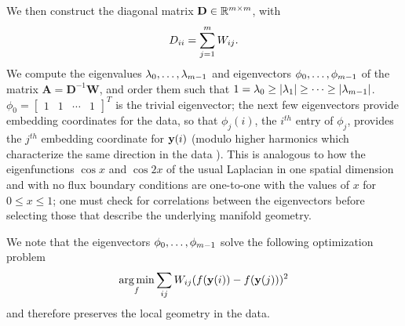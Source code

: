 We then construct the diagonal matrix $\mathbf{D} \in \mathbb{R}^{m \times m}$, with
\begin{equation}
D_{ii} = \sum_{j=1}^m W_{ij}.
\end{equation}
%
We compute the eigenvalues $\lambda_0, \dots, \lambda_{m-1}$ and eigenvectors $\phi_0, \dots, \phi_{m-1}$ of the matrix $\mathbf{A} = \mathbf{D}^{-1}\mathbf{W}$, and order them such that $1 = \lambda_0 \ge |\lambda_1| \ge \dots \ge |\lambda_{m-1}|$.
%
$\phi_0 = \begin{bmatrix} 1 & 1 & \cdots & 1 \end{bmatrix}^T$
is the trivial eigenvector; the next few eigenvectors provide embedding coordinates for the data, so that $\phi_j(i)$, the $i^{th}$ entry of $\phi_j$, provides the $j^{th}$ embedding coordinate for $\mathbf{y}(i)$ (modulo higher harmonics which characterize
the same direction in the data \cite{ferguson2010systematic}).
%
This is analogous to how the eigenfunctions $\cos x$ and $\cos 2x$ of the usual Laplacian in one spatial dimension
and with no flux boundary conditions are one-to-one with the values of $x$ for $0 \le x \le 1$;
one must check for correlations between the eigenvectors before selecting those that describe the underlying manifold geometry.


We note that the eigenvectors $\phi_0, \dots, \phi_{m-1}$ solve the following optimization problem \citep{Belkin2003}
\begin{equation} \label{eq:dmaps_opt_problem}
\operatorname*{arg\,min}_{f} \sum_{ij} W_{ij} (f(\mathbf{y}(i)) - f(\mathbf{y}(j)))^2
\end{equation}
and therefore preserves the local geometry in the data.

